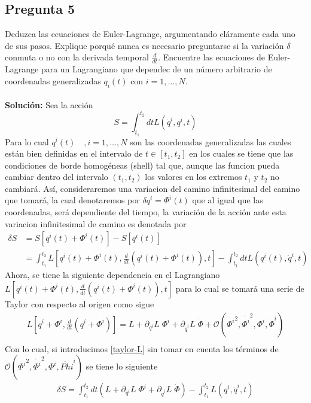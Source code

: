 \documentclass[../main_ej.tex]{subfiles}
\begin{document}
\subsection{Pregunta 5}
Deduzca las ecuaciones de Euler-Lagrange, argumentando cláramente cada uno de sus pasos. Explique porqué nunca es necesario preguntarse si la variación $\delta$ conmuta o no con la derivada temporal $\frac{d}{dt}$. Encuentre las ecuaciones de Euler-Lagrange para un Lagrangiano que dependec de un número arbitrario de coordenadas generalizadas $q_i(t)$ con $i=1,\dots ,N$. \\
\\
\textbf{Solución:}
Sea la acción
\begin{equation}
  S= \int_{t_1}^{t_2}dt L(\dot{q}^i,q^i,t) 
\end{equation}
Para lo cual $q^i(t)\quad , i=1,\dots , N$ son las coordenadas generalizadas las cuales están bien definidas en el intervalo de $t\in[t_1,t_2]$ en los cuales se tiene que las condiciones de borde homogéneas (shell) tal que, aunque las funcion pueda cambiar dentro del intervalo $(t_1,t_2)$ los valores en los extremos $t_1$ y $t_2$ no cambiará. Así, consideraremos una variacion del camino infinitesimal del camino que tomará, la cual denotaremos por $\delta q^i=\Phi^i(t)$ que al igual que las coordenadas, será dependiente del tiempo, la variación de la acción ante esta variacion infinitesimal de camino es denotada por
\begin{align*}
  \delta S & =S[q^i(t)+\Phi^i(t)]-S[q^i(t)] \\
           & = \int_{t_1}^{t_2} L\left[ q^i(t) + \Phi^i(t) , \frac{d}{dt}\left( q^i(t)+\Phi^i(t)\right ),t \right] - \int_{t_1}^{t_2}dtL (q^i(t), \dot{q}^i,t) 
\end{align*}
Ahora, se tiene la siguiente dependencia en el Lagrangiano  $L\left[ q^i(t) + \Phi^i(t) , \frac{d}{dt}\left( q^i(t)+\Phi^i(t)\right),t \right]$ para lo cual se tomará una serie de Taylor con respecto al origen como sigue
\begin{align} 
  L\left[q^i+\Phi^i, \frac{d}{dt}\left(q^i+ \Phi^i  \right) \right]= L + \partial_{q^i} L \; \Phi^i + \partial_{\dot{q}^i}L \;  \dot{\Phi} + \mathcal{O}({\Phi^i}^2,\dot{\Phi^i}^2 , \Phi^i, \dot{\Phi}^i) \label{taylor-L} \\
\end{align}
Con lo cual, si introducimos \eqref{taylor-L} sin tomar en cuenta los términos de $ \mathcal{O}({\Phi^i}^2,\dot{\Phi^i}^2 , \Phi^i, \dot{Phi}^i)$ se tiene lo siguiente
\begin{align*}
  \delta S  = \int_{t_1}^{t_2} dt \left(  L + \partial_{q^i} L \; \Phi^i + \partial_{\dot{q}^i}L \;  \dot{\Phi} \right) - \int_{t_1}^{t_2} L(q^i,\dot{q}^i,t)  
\end{align*}
\end{document}
